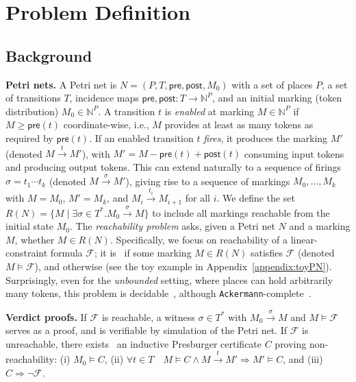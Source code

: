 \vspace{-3.0pt}
\section{Problem Definition}
\label{sec:problem-definition}


\subsection{Background}
\label{subsec:background}

\textbf{Petri nets.} 
A Petri net is $N=(P,T,\mathsf{pre},\mathsf{post},M_0)$ with a set of places $P$, a set of transitions $T$, incidence maps $\mathsf{pre},\mathsf{post}:T\to\mathbb N^P$, and an initial marking (token distribution) $M_0\in\mathbb N^P$.  
A transition $t$ is \textit{enabled} at marking $M \in \mathbb N^P$ if $M\ge \mathsf{pre}(t)$ coordinate-wise, i.e., $M$ provides at least as many tokens as required by $\mathsf{pre}(t)$.
%
If an enabled transition \(t\) \textit{fires}, it produces the marking $M'$ (denoted $M\xrightarrow{t}M'$), with $M'= M - \mathsf{pre}(t) + \mathsf{post}(t)$ consuming input tokens and producing output tokens.
%
This can extend naturally to a sequence of firings $\sigma = t_1\cdots t_k$ (denoted $M \xrightarrow{\sigma} M'$), giving rise to a sequence of markings $M_0,\ldots,M_k$ with $M=M_0$, $M'=M_k$, and $M_i \xrightarrow{t_{i}} M_{i+1}$ for all $i$. 
% 
We define the set $R(N)=\{M \mid \exists \sigma\in T^*. M_0 \xrightarrow{\sigma} M\}$ to include all markings reachable from the initial state $M_0$.
% 
The \textit{reachability problem} asks, given a Petri net $N$ and a marking $M$, whether $M\in R(N)$. 
%
Specifically, we focus on reachability of a linear-constraint formula $\mathcal {F}$; it is \sat\ if some marking $M\in R(N)$ satisfies $\mathcal {F}$ (denoted $M \models \mathcal {F}$), and otherwise \unsat{} (see the toy example in 	Appendix~\ref{appendix:toyPN}).
%
Surprisingly, even for the \textit{unbounded} setting, where places can hold arbitrarily many tokens, this problem is decidable~\cite{Ma81,Ko82,La92}, although \texttt{Ackermann}-complete~\cite{CzWo22,Le22}.   



\medskip
\noindent
\textbf{Verdict proofs.} 
If $\mathcal {F}$ is reachable, a witness $\sigma\in T^*$ with $M_0\xrightarrow{\sigma}M$ and $M\models \mathcal {F}$ serves as a proof, and is verifiable by simulation of the Petri net.  
If $\mathcal {F}$ is unreachable, there exists~\cite{Le09} an inductive Presburger certificate $C$ proving non-reachability: 
(i) $M_0\models C$, (ii) $\forall t\in T \quad M\models C \wedge M\xrightarrow{t}M'\Rightarrow M'\models C$, and (iii) $C\Rightarrow \neg \mathcal {F}$.

